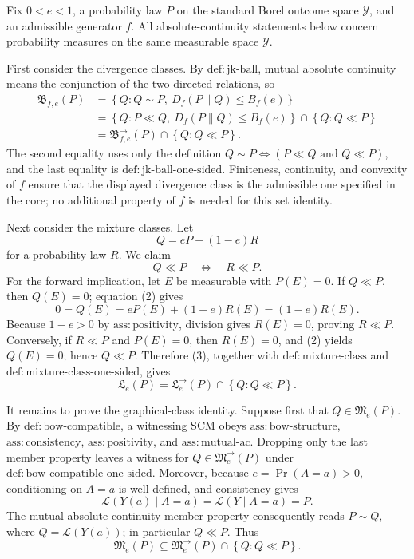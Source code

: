 Fix \(0<e<1\), a probability law \(P\) on the standard Borel outcome space \(\mathcal Y\), and an admissible generator \(f\).  All absolute-continuity statements below concern probability measures on the same measurable space \(\mathcal Y\).

First consider the divergence classes.  By \(\mathrm{def:jk\text{-}ball}\), mutual absolute continuity means the conjunction of the two directed relations, so
\[
\begin{aligned}
\mathfrak B_{f,e}(P)
&=\left\{Q:Q\sim P,\ D_f(P\|Q)\le B_f(e)\right\}\\
&=\left\{Q:P\ll Q,\ D_f(P\|Q)\le B_f(e)\right\}
  \cap\left\{Q:Q\ll P\right\}\\
&=\mathfrak B^{\to}_{f,e}(P)\cap\left\{Q:Q\ll P\right\}.
\end{aligned}
\tag{1}
\]
The second equality uses only the definition \(Q\sim P\iff(P\ll Q\text{ and }Q\ll P)\), and the last equality is \(\mathrm{def:jk\text{-}ball\text{-}one\text{-}sided}\).  Finiteness, continuity, and convexity of \(f\) ensure that the displayed divergence class is the admissible one specified in the core; no additional property of \(f\) is needed for this set identity.

Next consider the mixture classes.  Let
\[
Q=eP+(1-e)R
\tag{2}
\]
for a probability law \(R\).  We claim
\[
Q\ll P\quad\Longleftrightarrow\quad R\ll P.
\tag{3}
\]
For the forward implication, let \(E\) be measurable with \(P(E)=0\).  If \(Q\ll P\), then \(Q(E)=0\); equation (2) gives
\[
0=Q(E)=eP(E)+(1-e)R(E)=(1-e)R(E).
\]
Because \(1-e>0\) by \(\mathrm{ass:positivity}\), division gives \(R(E)=0\), proving \(R\ll P\).  Conversely, if \(R\ll P\) and \(P(E)=0\), then \(R(E)=0\), and (2) yields \(Q(E)=0\); hence \(Q\ll P\).  Therefore (3), together with \(\mathrm{def:mixture\text{-}class}\) and \(\mathrm{def:mixture\text{-}class\text{-}one\text{-}sided}\), gives
\[
\mathfrak L_e(P)
=\mathfrak L^{\to}_e(P)\cap\left\{Q:Q\ll P\right\}.
\tag{4}
\]

It remains to prove the graphical-class identity.  Suppose first that \(Q\in\mathfrak M_e(P)\).  By \(\mathrm{def:bow\text{-}compatible}\), a witnessing SCM obeys \(\mathrm{ass:bow\text{-}structure}\), \(\mathrm{ass:consistency}\), \(\mathrm{ass:positivity}\), and \(\mathrm{ass:mutual\text{-}ac}\).  Dropping only the last member property leaves a witness for \(Q\in\mathfrak M^{\to}_e(P)\) under \(\mathrm{def:bow\text{-}compatible\text{-}one\text{-}sided}\).  Moreover, because \(e=\Pr(A=a)>0\), conditioning on \(A=a\) is well defined, and consistency gives
\[
\mathcal L(Y(a)\mid A=a)=\mathcal L(Y\mid A=a)=P.
\tag{5}
\]
The mutual-absolute-continuity member property consequently reads \(P\sim Q\), where \(Q=\mathcal L(Y(a))\); in particular \(Q\ll P\).  Thus
\[
\mathfrak M_e(P)
\subseteq \mathfrak M^{\to}_e(P)\cap\left\{Q:Q\ll P\right\}.
\tag{6}
\]

